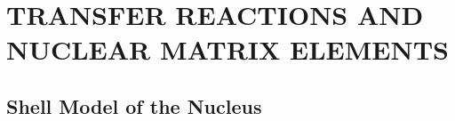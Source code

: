 %
%
%
%
%
%
%
%

%
%

\chapter{TRANSFER REACTIONS AND NUCLEAR MATRIX ELEMENTS}
\label{chap:nucl}

\section{Shell Model of the Nucleus}

